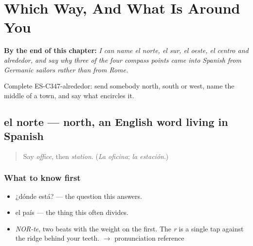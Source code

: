 
\chapter{Which Way, And What Is Around You}
\label{ch:el-norte-y-el-sur}

\begin{chapteropening}
\textbf{By the end of this chapter:} \emph{I can name el norte, el sur, el oeste, el centro and alrededor, and say why three of the four compass points came into Spanish from Germanic sailors rather than from Rome.}

Complete ES-C347-alrededor: send somebody north, south or west, name the middle of a town, and say what encircles it.
\end{chapteropening}

\section[el norte]{el norte — north, an English word living in Spanish}

\label{lesson:ES-C347-norte}



\begin{quote}
Say \emph{office}, then \emph{station}. (\emph{La oficina}; \emph{la estación}.)
\end{quote}

\subsection*{What to know first}
\begin{itemize}
\raggedright
  \item ¿dónde está? — the question this answers.
  \item el país — the thing this often divides.
\end{itemize}

\begin{sounds}
\begin{itemize}
\raggedright
  \item \emph{NOR-te}, two beats with the weight on the first. The \emph{r} is a single tap against the ridge behind your teeth. $\to$ pronunciation reference
\end{itemize}
\end{sounds}

